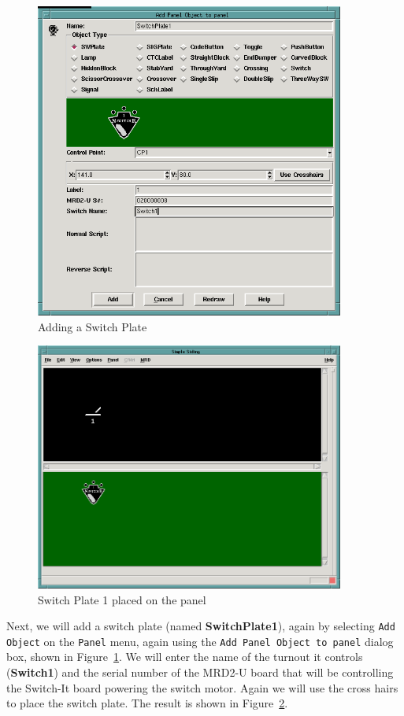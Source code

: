 \begin{figure}[hbpt] 
\begin{centering}
\includegraphics[width=4in]{DISPSimpleTutSWPlate1.png} 
\caption{Adding a Switch Plate} 
\label{fig:dispatcher:Tut:SWPlate1}
\end{centering}
\end{figure} 
%
\begin{figure}[hbpt] 
\begin{centering}
\includegraphics[width=4in]{DISPSimpleTutPanel2.png} 
\caption{Switch Plate 1 placed on the panel} 
\label{fig:dispatcher:Tut:panel2} 
\end{centering}
\end{figure} 
%
Next, we will add a switch plate (named \textbf{SwitchPlate1}), again
by selecting \texttt{Add Object} on the \texttt{Panel} menu, again
using the \texttt{Add Panel Object to panel} dialog box, shown in
Figure~\ref{fig:dispatcher:Tut:SWPlate1}. We will enter the name of the
turnout it controls (\textbf{Switch1}) and the serial number of the
MRD2-U board that will be controlling the Switch-It board powering the
switch motor. Again we will use the cross hairs to place the switch
plate. The result is shown in Figure~\ref{fig:dispatcher:Tut:panel2}.

